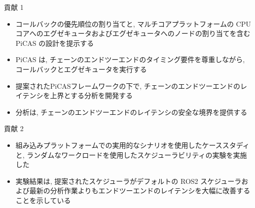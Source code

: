 \begin{frame}{貢献 1}
    \begin{itemize}
        \item  コールバックの優先順位の割り当てと, マルチコアプラットフォームの CPU コアへのエグゼキュータおよびエグゼキュータへのノードの割り当てを含む PiCAS の設計を提示する
        \item PiCAS は, チェーンのエンドツーエンドのタイミング要件を尊重しながら, コールバックとエグゼキュータを実行する
        \item  提案されたPiCASフレームワークの下で, チェーンのエンドツーエンドのレイテンシを上界とする分析を開発する
        \item 分析は, チェーンのエンドツーエンドのレイテンシの安全な境界を提供する
    \end{itemize}
\end{frame}

\begin{frame}{貢献 2}
    \begin{itemize}
        \item 組み込みプラットフォームでの実用的なシナリオを使用したケーススタディと, ランダムなワークロードを使用したスケジューラビリティの実験を実施した
        \item 実験結果は, 提案されたスケジューラがデフォルトの ROS2 スケジューラおよび最新の分析作業よりもエンドツーエンドのレイテンシを大幅に改善することを示している
    \end{itemize}
\end{frame}
